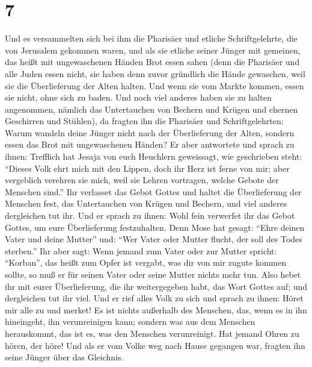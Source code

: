 \hypertarget{section-6}{%
\section{7}\label{section-6}}

 Und es versammelten sich bei ihm die Pharisäer und
etliche Schriftgelehrte, die von Jerusalem gekommen waren,
 und als sie etliche seiner Jünger mit gemeinen, das heißt
mit ungewaschenen Händen Brot essen sahen  (denn die
Pharisäer und alle Juden essen nicht, sie haben denn zuvor gründlich die
Hände gewaschen, weil sie die Überlieferung der Alten halten.
 Und wenn sie vom Markte kommen, essen sie nicht, ohne
sich zu baden. Und noch viel anderes haben sie zu halten angenommen,
nämlich das Untertauchen von Bechern und Krügen und ehernen Geschirren
und Stühlen),  da fragten ihn die Pharisäer und
Schriftgelehrten: Warum wandeln deine Jünger nicht nach der
Überlieferung der Alten, sondern essen das Brot mit ungewaschenen
Händen?  Er aber antwortete und sprach zu ihnen: Trefflich
hat Jesaja von euch Heuchlern geweissagt, wie geschrieben steht:
``Dieses Volk ehrt mich mit den Lippen, doch ihr Herz ist ferne von mir;
 aber vergeblich verehren sie mich, weil sie Lehren
vortragen, welche Gebote der Menschen sind.''  Ihr
verlasset das Gebot Gottes und haltet die Überlieferung der Menschen
fest, das Untertauchen von Krügen und Bechern, und viel anderes
dergleichen tut ihr.  Und er sprach zu ihnen: Wohl fein
verwerfet ihr das Gebot Gottes, um eure Überlieferung festzuhalten.
 Denn Mose hat gesagt: ``Ehre deinen Vater und deine
Mutter'' und: ``Wer Vater oder Mutter flucht, der soll des Todes
sterben.''  Ihr aber sagt: Wenn jemand zum Vater oder zur
Mutter spricht: ``Korban'', das heißt zum Opfer ist vergabt, was dir von
mir zugute kommen sollte,  so muß er für seinen Vater
oder seine Mutter nichts mehr tun.  Also hebet ihr mit
eurer Überlieferung, die ihr weitergegeben habt, das Wort Gottes auf;
und dergleichen tut ihr viel.  Und er rief alles Volk zu
sich und sprach zu ihnen: Höret mir alle zu und merket! 
Es ist nichts außerhalb des Menschen, das, wenn es in ihn hineingeht,
ihn verunreinigen kann; sondern was aus dem Menschen herauskommt, das
ist es, was den Menschen verunreinigt.  Hat jemand Ohren
zu hören, der höre!  Und als er vom Volke weg nach Hause
gegangen war, fragten ihn seine Jünger über das Gleichnis.
